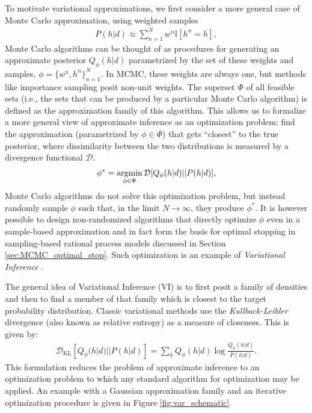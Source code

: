 To motivate variational approximations, we first consider a more general case of Monte Carlo approximation, using weighted samples
\begin{align}
    P(h|d) \approx \sum_{n=1}^N w^n \mathbb{I}[h^n = h],
    \label{eq:montecarlo}
\end{align}
Monte Carlo algorithms can be thought of as procedures for generating an approximate posterior $Q_\phi(h|d)$ parametrized by the set of these weights and samples, $\phi = \{ w^n, h^n \}_{n=1}^N$. In MCMC, these weights are always one, but methods like importance sampling posit non-unit weights. The superset $\Phi$ of all feasible sets (i.e., the sets that can be produced by a particular Monte Carlo algorithm) is defined as the approximation family of this algorithm. This allows us to formalize a more general view of approximate inference as an optimization problem: find the approximation (parametrized by $\phi \in \Phi$) that gets ``closest'' to the true posterior, where dissimilarity between the two distributions is measured by a divergence functional $\mathcal{D}$. 
\begin{align}
\phi^\ast = \operatorname*{argmin}_{\phi \in \Phi} \mathcal{D}[Q_\phi(h|d)||P(h|d)],
\end{align}
Monte Carlo algorithms do not solve this optimization problem, but instead randomly sample $\phi$ such that, in the limit $N \rightarrow \infty$, they produce $\phi^\ast$. It is however possible to design non-randomized algorithms that directly optimize $\phi$ even in a sample-based approximation\citep{saeedi2017variational} and in fact form the basis for optimal stopping in sampling-based rational process models discussed in Section \ref{sec:MCMC_optimal_stop}. Such optimization is an example of \emph{Variational Inference} \citep{jordan1999introduction}.

The general idea of Variational Inference (VI) is to first posit a family of densities and then to find a member of that family which is closest to the target probability distribution. Classic variational methods use the \textit{Kullback-Leibler} divergence (also known as relative entropy) as a measure of closeness. This is given by:
\begin{align}
\mathcal{D}_{\text{KL}}[Q_\phi(h|d)||P(h|d)] = \sum_h Q_\phi(h|d) \log \frac{Q_\phi(h|d)}{P(h|d)}.
\end{align}
This formulation reduces the problem of approximate inference to an optimization problem to which any standard algorithm for optimization may be applied. An example with a Gaussian approximation family and an iterative optimization procedure is given in Figure \ref{fig:var_schematic}.

